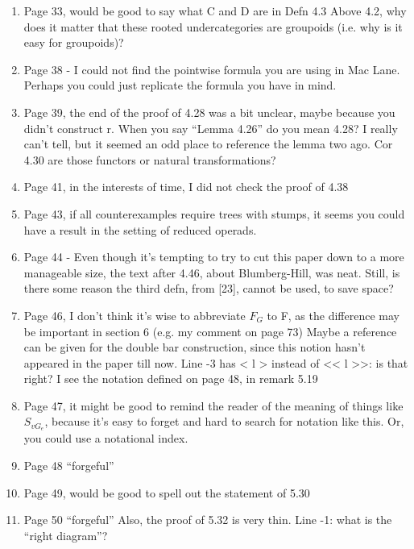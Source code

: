 \documentclass{article}
\begin{document}
\begin{enumerate}
\item
Page 33, would be good to say what C and D are in Defn 4.3
Above 4.2, why does it matter that these rooted undercategories are groupoids (i.e. why is it easy for groupoids)?

\item
Page 38 - I could not find the pointwise formula you are using in Mac Lane. Perhaps you could just replicate the formula you have in mind.

\item
Page 39, the end of the proof of 4.28 was a bit unclear, maybe because you didn't construct r.
When you say ``Lemma 4.26'' do you mean 4.28? I really can't tell, but it seemed an odd place to reference the lemma two ago.
Cor 4.30 are those functors or natural transformations?

\item
Page 41, in the interests of time, I did not check the proof of 4.38

\item
Page 43, if all counterexamples require trees with stumps, it seems you could have a result in the setting of reduced operads.

\item
Page 44 - Even though it's tempting to try to cut this paper down to a more manageable size, the text after 4.46, about Blumberg-Hill, was neat. Still, is there some reason the third defn, from [23], cannot be used, to save space?

\item
Page 46, I don't think it's wise to abbreviate $F_G$ to F, as the difference may be important in section 6 (e.g. my comment on page 73)
Maybe a reference can be given for the double bar construction, since this notion hasn't appeared in the paper till now.
Line -3 has < l > instead of << l >>: is that right? I see the notation defined on page 48, in remark 5.19

\item
Page 47, it might be good to remind the reader of the meaning of things like $S_{v G_e}$, because it's easy to forget and hard to search for notation like this. Or, you could use a notational index.

\item
Page 48 ``forgeful''

\item
Page 49, would be good to spell out the statement of 5.30

\item
Page 50 ``forgeful''
Also, the proof of 5.32 is very thin.
Line -1: what is the ``right diagram''?


\end{enumerate}
\end{document}

